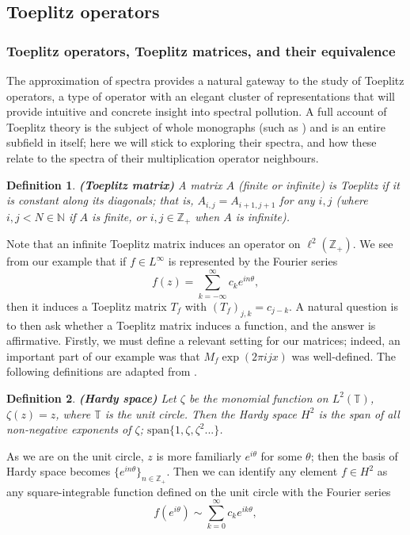 \documentclass{article}
\newcommand{\1}{\mathbf{1}}
\newtheorem{definition}{Definition}[section]
\begin{document}
\subsection{Toeplitz operators}
\subsubsection{Toeplitz operators, Toeplitz matrices, and their equivalence}

The approximation of spectra provides a natural gateway to the study of Toeplitz operators, a type of operator with an elegant cluster
of representations that will provide intuitive and concrete insight into spectral pollution. A full account of Toeplitz theory is the subject
of whole monographs (such as \parencite{bottcher2006analysis}) and is an entire subfield in itself;
here we will stick to exploring their spectra, and how these relate to the spectra of their multiplication operator neighbours. 

\begin{definition}{\textbf{(Toeplitz matrix)}}
A matrix $A$ (finite or infinite) is Toeplitz if it is constant along its diagonals; that is, $A_{i,j} = A_{i+1,j+1}$
for any $i, j$ (where $i,j < N \in \mathbb{N}$ if $A$ is finite, or $i,j \in \mathbb{Z}_+$ when $A$ is infinite).
\end{definition}

Note that an infinite Toeplitz matrix induces an operator on $\ell^2(\mathbb{Z}_+)$.
We see from our example that if $f \in L^\infty$ is represented by the Fourier series
$$f(z) = \sum_{k=-\infty}^{\infty} c_k e^{i n \theta},$$
then it induces a Toeplitz matrix $T_f$ with $(T_f)_{j,k} = c_{j-k}$.
A natural question is to then ask whether a Toeplitz matrix induces a function, and the answer is affirmative. Firstly, we must define a relevant setting for our matrices; indeed, an important part of our
example was that $M_f \exp(2 \pi i j x)$ was well-defined. The following definitions are adapted from \parencite{arveson2002short}.

\begin{definition}{\textbf{(Hardy space)}}
Let $\zeta$ be the monomial function on $L^2(\mathbb{T})$, $\zeta(z) = z$, where $\mathbb{T}$ is the unit circle. Then the
Hardy space $H^2$ is the span of all non-negative exponents of $\zeta$; $\text{span}\{1, \zeta, \zeta^2...\}$.
\end{definition}

As we are on the unit circle, $z$ is more familiarly $e^{i \theta}$ for some $\theta$; then the basis of Hardy space becomes $\{e^{i n \theta}\}_{n \in \mathbb{Z}_+}$. Then we can identify any element $f \in H^2$ as any square-integrable function defined on the unit circle with the Fourier series 
$$f(e^{i \theta}) \sim \sum_{k=0}^\infty c_k e^{i k \theta},$$
\end{document}
